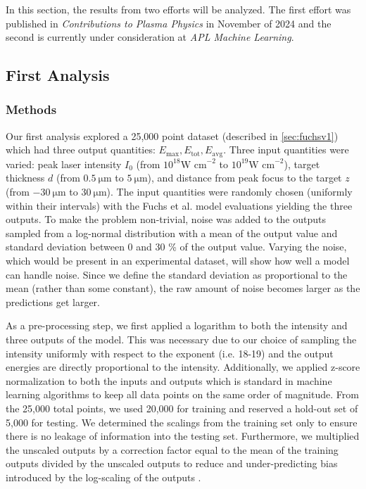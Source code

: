 In this section, the results from two efforts will be analyzed. The first effort was published in \emph{Contributions to Plasma Physics} \cite{Desai_2024_CPP} in November of 2024 and the second is currently under consideration at \emph{APL Machine Learning}.

\subsection{First Analysis}

\subsubsection{Methods}
Our first analysis explored a 25,000 point dataset (described in \autoref{sec:fuchsv1}) which had three output quantities: $E_\text{max}, E_\text{tot}, E_\text{avg}$. Three input quantities were varied: peak laser intensity $I_0$ (from  $10^{18} \text{W cm}^{-2}$ to $10^{19} \text{W cm}^{-2}$), target thickness $d$ (from $\SI{0.5}{\micro \meter}$ to $\SI{5}{\micro \meter}$), and distance from peak focus to the target $z$ (from $\SI{-30}{\micro \meter}$ to $\SI{30}{\micro \meter}$). The input quantities were randomly chosen (uniformly within their intervals) with the Fuchs et al. model evaluations yielding the three outputs. To make the problem non-trivial, noise was added to the outputs sampled from a log-normal distribution with a mean of the output value and standard deviation between 0 and 30 \% of the output value. Varying the noise, which would be present in an experimental dataset, will show how well a model can handle noise. Since we define the standard deviation as proportional to the mean (rather than some constant), the raw amount of noise becomes larger as the predictions get larger.

As a pre-processing step, we first applied a logarithm to both the intensity and three outputs of the model. This was necessary due to our choice of sampling the intensity uniformly with respect to the exponent (i.e. 18-19) and the output energies are directly proportional to the intensity. Additionally, we applied z-score normalization to both the inputs and outputs which is standard in machine learning algorithms to keep all data points on the same order of magnitude. From the 25,000 total points, we used 20,000 for training and reserved a hold-out set of 5,000 for testing. We determined the scalings from the training set only to ensure there is no leakage of information into the testing set. Furthermore, we multiplied the unscaled outputs by a correction factor equal to the mean of the training outputs divided by the unscaled outputs to reduce and under-predicting bias introduced by the log-scaling of the outputs \cite{Miller_1984_AmStat}.

